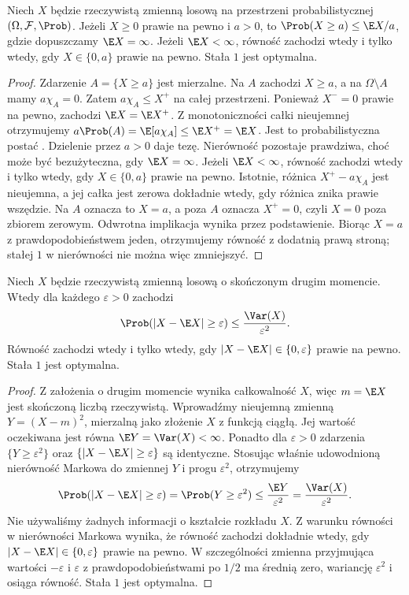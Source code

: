 \begin{twierdzenie}
Niech $X$ będzie rzeczywistą zmienną losową na przestrzeni
probabilistycznej $(\Omega,\mathcal F,\Prob)$. Jeżeli
$X\geq0$ prawie na pewno i $a>0$, to
$\Prob(X\geq a)\leq\E X/a$, gdzie dopuszczamy $\E X=\infty$.
Jeżeli $\E X<\infty$, równość zachodzi wtedy i tylko wtedy,
gdy $X\in\{0,a\}$ prawie na pewno. Stała $1$ jest optymalna.
\end{twierdzenie}
\begin{proof}
Zdarzenie $A=\{X\geq a\}$ jest mierzalne. Na $A$ zachodzi
$X\geq a$, a na $\Omega\setminus A$ mamy $a\chi_A=0$.
Zatem $a\chi_A\leq X^+$ na całej przestrzeni.
Ponieważ $X^-=0$ prawie na pewno, zachodzi $\E X=\E X^+$.
Z monotoniczności całki nieujemnej otrzymujemy
$a\Prob(A)=\E[a\chi_A]\leq\E X^+=\E X$.
Jest to probabilistyczna postać
.
Dzielenie przez $a>0$ daje tezę. Nierówność pozostaje
prawdziwa, choć może być bezużyteczna, gdy $\E X=\infty$.
Jeżeli $\E X<\infty$, równość zachodzi wtedy i tylko wtedy,
gdy $X\in\{0,a\}$ prawie na pewno. Istotnie, różnica
$X^+-a\chi_A$ jest nieujemna, a jej całka jest zerowa
dokładnie wtedy, gdy różnica znika prawie wszędzie.
Na $A$ oznacza to $X=a$, a poza $A$ oznacza $X^+=0$,
czyli $X=0$ poza zbiorem zerowym. Odwrotna implikacja
wynika przez podstawienie. Biorąc $X=a$ z prawdopodobieństwem
jeden, otrzymujemy równość z dodatnią prawą stroną;
stałej $1$ w nierówności nie można więc zmniejszyć.
\end{proof}

\begin{twierdzenie}
Niech $X$ będzie rzeczywistą zmienną losową o skończonym
drugim momencie. Wtedy dla każdego $\varepsilon>0$ zachodzi
\[
\Prob(|X-\E X|\geq\varepsilon)
\leq\frac{\Var(X)}{\varepsilon^2}.
\]
Równość zachodzi wtedy i tylko wtedy, gdy
$|X-\E X|\in\{0,\varepsilon\}$ prawie na pewno.
Stała $1$ jest optymalna.
\end{twierdzenie}
\begin{proof}
Z założenia o drugim momencie wynika całkowalność $X$,
więc $m=\E X$ jest skończoną liczbą rzeczywistą.
Wprowadźmy nieujemną zmienną
$Y=(X-m)^2$, mierzalną jako złożenie $X$ z funkcją ciągłą. Jej wartość oczekiwana jest równa
$\E Y=\Var(X)<\infty$. Ponadto dla $\varepsilon>0$
zdarzenia
$\{Y\geq\varepsilon^2\}$ oraz
$\{|X-\E X|\geq\varepsilon\}$ są identyczne.
Stosując właśnie udowodnioną nierówność Markowa
do zmiennej $Y$ i progu $\varepsilon^2$, otrzymujemy
\[
\Prob(|X-\E X|\geq\varepsilon)
=\Prob(Y\geq\varepsilon^2)
\leq\frac{\E Y}{\varepsilon^2}
=\frac{\Var(X)}{\varepsilon^2}.
\]
Nie używaliśmy żadnych informacji o kształcie rozkładu $X$.
Z warunku równości w nierówności Markowa wynika, że
równość zachodzi dokładnie wtedy, gdy
$|X-\E X|\in\{0,\varepsilon\}$ prawie na pewno.
W szczególności zmienna przyjmująca wartości
$-\varepsilon$ i $\varepsilon$ z prawdopodobieństwami
po $1/2$ ma średnią zero, wariancję $\varepsilon^2$
i osiąga równość. Stała $1$ jest optymalna.
\end{proof}

